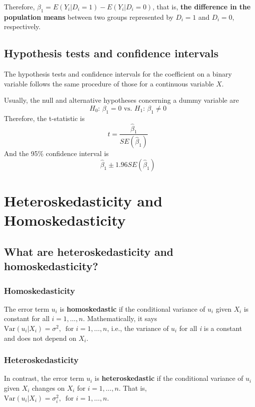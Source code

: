 \documentclass[a4paper,11pt]{article}
\newcommand{\var}{\mathrm{Var}}
\begin{document}
Therefore, \(\beta_1 = E(Y_i | D_i = 1) - E(Y_i |D_i = 0)\), that is,
\textbf{the difference in the population means} between two groups represented by
\(D_i = 1\) and \(D_i = 0\), respectively.


\subsection{Hypothesis tests and confidence intervals}
\label{sec:org5d38225}

The hypothesis tests and confidence intervals for the coefficient on a
binary variable follows the same procedure of those for a continuous
variable \(X\). 

Usually, the null and alternative hypotheses concerning a dummy variable are
\[ H_0:\, \beta_1 = 0 \text{ vs. } H_1:\, \beta_1 \neq 0 \]
Therefore, the t-statistic is 
\[ t = \frac{\hat{\beta}_1}{SE(\hat{\beta}_1)} \]
And the 95\% confidence interval is
\[ \hat{\beta}_1 \pm 1.96 SE(\hat{\beta}_1) \]


\section{Heteroskedasticity and Homoskedasticity}
\label{sec:org7a2c299}

\subsection{What are heteroskedasticity and homoskedasticity?}
\label{sec:org0e73e07}

\subsubsection*{Homoskedasticity}
\label{sec:org7297177}

The error term \(u_i\) is \textbf{homoskedastic} if the conditional variance of
\(u_i\) given \(X_i\) is constant for all \(i = 1, \ldots, n\). Mathematically,
it says \(\var(u_i | X_i) = \sigma^2,\, \text{ for } i = 1, \ldots, n\),
i.e., the variance of \(u_i\) for all \emph{i} is a constant and does not
depend on \(X_i\).

\subsubsection*{Heteroskedasticity}
\label{sec:org716a4ff}
In contrast, the error term \(u_i\) is \textbf{heteroskedastic} if the conditional variance of
\(u_i\) given \(X_i\) changes on \(X_i\) for \(i = 1, \ldots, n\). That is,
\(\var(u_i | X_i) = \sigma^2_i,\, \text{ for } i = 1, \ldots, n\). 
\end{document}
